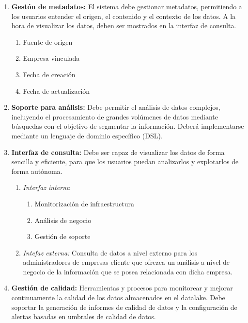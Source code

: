 \begin{enumerate}[label=RF\arabic*.]
	\item \textbf{Gestón de metadatos:} El sistema debe gestionar metadatos, permitiendo a los
		usuarios entender el origen, el contenido y el contexto de los datos. A la hora de
		visualizar los datos, deben ser mostrados en la interfaz de consulta.
		\begin{enumerate}[label*=\arabic*.]
			\item Fuente de origen
			\item Empresa vinculada
			\item Fecha de creación
			\item Fecha de actualización
		\end{enumerate}
	\item \textbf{Soporte para análisis:} Debe permitir el análisis de datos complejos, incluyendo
		el procesamiento de grandes volúmenes de datos mediante búsquedas con el objetivo de segmentar
		la información. Deberá implementarse mediante un lenguaje de dominio específico (DSL).
	\item \textbf{Interfaz de consulta:} Debe ser capaz de visualizar los datos de forma sencilla y
		eficiente, para que los usuarios puedan analizarlos y explotarlos de forma autónoma.
		\begin{enumerate}[label*=\arabic*.]
			\item \emph{Interfaz interna}
				\begin{enumerate}[label*=\arabic*.]
					\item Monitorización de infraestructura
					\item Análisis de negocio
					\item Gestión de soporte
				\end{enumerate}
			\item \emph{Intefaz externa:} Consulta de datos a nivel externo para los administradores de
				empresas cliente que ofrezca un análisis a nivel de negocio de la información que se
				posea relacionada con dicha empresa.
		\end{enumerate}
	\item \textbf{Gestión de calidad:} Herramientas y procesos para monitorear y mejorar continuamente
		la calidad de los datos almacenados en el datalake. Debe soportar la generación de informes de
		calidad de datos y la configuración de alertas basadas en umbrales de calidad de datos.
\end{enumerate}

